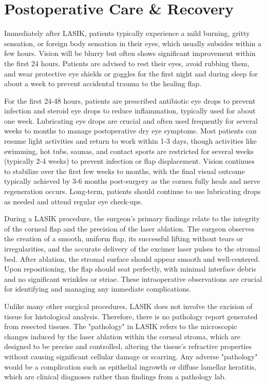 \section*{Postoperative Care \& Recovery}
Immediately after LASIK, patients typically experience a mild burning, gritty sensation, or foreign body sensation in their eyes, which usually subsides within a few hours. Vision will be blurry but often shows significant improvement within the first 24 hours. Patients are advised to rest their eyes, avoid rubbing them, and wear protective eye shields or goggles for the first night and during sleep for about a week to prevent accidental trauma to the healing flap.

For the first 24-48 hours, patients are prescribed antibiotic eye drops to prevent infection and steroid eye drops to reduce inflammation, typically used for about one week. Lubricating eye drops are crucial and often used frequently for several weeks to months to manage postoperative dry eye symptoms. Most patients can resume light activities and return to work within 1-3 days, though activities like swimming, hot tubs, saunas, and contact sports are restricted for several weeks (typically 2-4 weeks) to prevent infection or flap displacement. Vision continues to stabilize over the first few weeks to months, with the final visual outcome typically achieved by 3-6 months post-surgery as the cornea fully heals and nerve regeneration occurs. Long-term, patients should continue to use lubricating drops as needed and attend regular eye check-ups.

During a LASIK procedure, the surgeon's primary findings relate to the integrity of the corneal flap and the precision of the laser ablation. The surgeon observes the creation of a smooth, uniform flap, its successful lifting without tears or irregularities, and the accurate delivery of the excimer laser pulses to the stromal bed. After ablation, the stromal surface should appear smooth and well-centered. Upon repositioning, the flap should seat perfectly, with minimal interface debris and no significant wrinkles or striae. These intraoperative observations are crucial for identifying and managing any immediate complications.

Unlike many other surgical procedures, LASIK does not involve the excision of tissue for histological analysis. Therefore, there is no pathology report generated from resected tissues. The "pathology" in LASIK refers to the microscopic changes induced by the laser ablation within the corneal stroma, which are designed to be precise and controlled, altering the tissue's refractive properties without causing significant cellular damage or scarring. Any adverse "pathology" would be a complication such as epithelial ingrowth or diffuse lamellar keratitis, which are clinical diagnoses rather than findings from a pathology lab.

